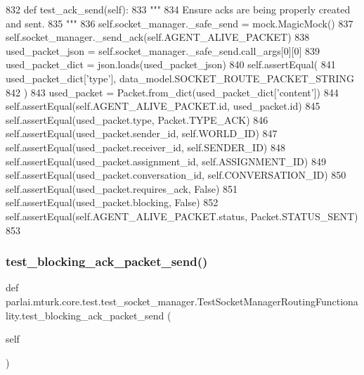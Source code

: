 \begin{DoxyCode}
832     \textcolor{keyword}{def }test\_ack\_send(self):
833         \textcolor{stringliteral}{"""}
834 \textcolor{stringliteral}{        Ensure acks are being properly created and sent.}
835 \textcolor{stringliteral}{        """}
836         self.socket\_manager.\_safe\_send = mock.MagicMock()
837         self.socket\_manager.\_send\_ack(self.AGENT\_ALIVE\_PACKET)
838         used\_packet\_json = self.socket\_manager.\_safe\_send.call\_args[0][0]
839         used\_packet\_dict = json.loads(used\_packet\_json)
840         self.assertEqual(
841             used\_packet\_dict[\textcolor{stringliteral}{'type'}], data\_model.SOCKET\_ROUTE\_PACKET\_STRING
842         )
843         used\_packet = Packet.from\_dict(used\_packet\_dict[\textcolor{stringliteral}{'content'}])
844         self.assertEqual(self.AGENT\_ALIVE\_PACKET.id, used\_packet.id)
845         self.assertEqual(used\_packet.type, Packet.TYPE\_ACK)
846         self.assertEqual(used\_packet.sender\_id, self.WORLD\_ID)
847         self.assertEqual(used\_packet.receiver\_id, self.SENDER\_ID)
848         self.assertEqual(used\_packet.assignment\_id, self.ASSIGNMENT\_ID)
849         self.assertEqual(used\_packet.conversation\_id, self.CONVERSATION\_ID)
850         self.assertEqual(used\_packet.requires\_ack, \textcolor{keyword}{False})
851         self.assertEqual(used\_packet.blocking, \textcolor{keyword}{False})
852         self.assertEqual(self.AGENT\_ALIVE\_PACKET.status, Packet.STATUS\_SENT)
853 
\end{DoxyCode}
\mbox{\label{classparlai_1_1mturk_1_1core_1_1test_1_1test__socket__manager_1_1TestSocketManagerRoutingFunctionality_a907258697c6983e9d93ad88a3ea83278}} 
\subsubsection{\texorpdfstring{test\+\_\+blocking\+\_\+ack\+\_\+packet\+\_\+send()}{test\_blocking\_ack\_packet\_send()}}
{\footnotesize\ttfamily def parlai.\+mturk.\+core.\+test.\+test\+\_\+socket\+\_\+manager.\+Test\+Socket\+Manager\+Routing\+Functionality.\+test\+\_\+blocking\+\_\+ack\+\_\+packet\+\_\+send (\begin{DoxyParamCaption}\item[{}]{self }\end{DoxyParamCaption})}

